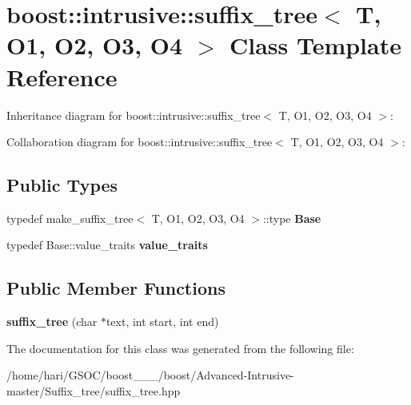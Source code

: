\hypertarget{classboost_1_1intrusive_1_1suffix__tree}{}\section{boost\+:\+:intrusive\+:\+:suffix\+\_\+tree$<$ T, O1, O2, O3, O4 $>$ Class Template Reference}
\label{classboost_1_1intrusive_1_1suffix__tree}


Inheritance diagram for boost\+:\+:intrusive\+:\+:suffix\+\_\+tree$<$ T, O1, O2, O3, O4 $>$\+:


Collaboration diagram for boost\+:\+:intrusive\+:\+:suffix\+\_\+tree$<$ T, O1, O2, O3, O4 $>$\+:
\subsection*{Public Types}
\begin{DoxyCompactItemize}
\item 
\mbox{\label{classboost_1_1intrusive_1_1suffix__tree_a4e4d560ba016e68c15ecf4c4f88331e5}} 
typedef make\+\_\+suffix\+\_\+tree$<$ T, O1, O2, O3, O4 $>$\+::type {\bfseries Base}
\item 
\mbox{\label{classboost_1_1intrusive_1_1suffix__tree_a20b10e59065c1615575e5f76038289fd}} 
typedef Base\+::value\+\_\+traits {\bfseries value\+\_\+traits}
\end{DoxyCompactItemize}
\subsection*{Public Member Functions}
\begin{DoxyCompactItemize}
\item 
\mbox{\label{classboost_1_1intrusive_1_1suffix__tree_a3a428cbd18b652d8bfea604a3edb0414}} 
{\bfseries suffix\+\_\+tree} (char $\ast$text, int start, int end)
\end{DoxyCompactItemize}


The documentation for this class was generated from the following file\+:\begin{DoxyCompactItemize}
\item 
/home/hari/\+G\+S\+O\+C/boost\+\_\+\_\+\_/boost/\+Advanced-\/\+Intrusive-\/master/\+Suffix\+\_\+tree/suffix\+\_\+tree.\+hpp\end{DoxyCompactItemize}
